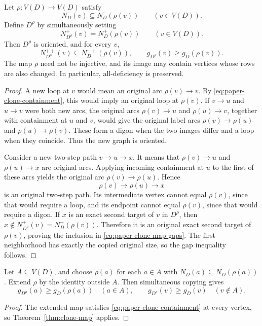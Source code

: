 \begin{theorem}
\label{thm:clone-map}
Let $\rho:V(D)\to V(D)$ satisfy
\begin{equation}
 N_D^-(v)\subseteq N_D^-(\rho(v))\qquad(v\in V(D)).
 \label{eq:paper-clone-containment}
\end{equation}
Define $D^\rho$ by simultaneously setting
\[
 N_{D^\rho}^+(v)=N_D^+(\rho(v))\qquad(v\in V(D)).
\]
Then $D^\rho$ is oriented, and for every $v$,
\begin{equation}
 N_{D^\rho}^{++}(v)\subseteq N_D^{++}(\rho(v)),
 \qquad g_{D^\rho}(v)\geq g_D(\rho(v)).
 \label{eq:paper-clone-map-gaps}
\end{equation}
The map $\rho$ need not be injective, and its image may contain vertices
whose rows are also changed. In particular, all-deficiency is preserved.
\end{theorem}
\begin{proof}
A new loop at $v$ would mean an original arc $\rho(v)\to v$.
By \eqref{eq:paper-clone-containment}, this would imply an original
loop at $\rho(v)$. If $v\to u$ and $u\to v$ were both new arcs,
the original arcs $\rho(v)\to u$ and $\rho(u)\to v$, together with
containment at $u$ and $v$, would give the original label arcs
$\rho(v)\to\rho(u)$ and $\rho(u)\to\rho(v)$. These form a digon
when the two images differ and a loop when they coincide. Thus the
new graph is oriented.

Consider a new two-step path $v\to u\to x$. It means that
$\rho(v)\to u$ and $\rho(u)\to x$ are original arcs. Applying
incoming containment at $u$ to the first of these arcs yields the
original arc $\rho(v)\to\rho(u)$. Hence
\[
 \rho(v)\to\rho(u)\to x
\]
is an original two-step path. Its intermediate vertex cannot equal
$\rho(v)$, since that would require a loop, and its endpoint cannot
equal $\rho(v)$, since that would require a digon. If $x$ is an exact
second target of $v$ in $D^\rho$, then
$x\notin N_{D^\rho}^+(v)=N_D^+(\rho(v))$. Therefore it is an
original exact second target of $\rho(v)$, proving the inclusion in
\eqref{eq:paper-clone-map-gaps}. The first neighborhood has exactly
the copied original size, so the gap inequality follows.
\end{proof}

\begin{corollary}
\label{cor:paper-subset-copy}
Let $A\subseteq V(D)$, and choose $\rho(a)$ for each $a\in A$ with
$N_D^-(a)\subseteq N_D^-(\rho(a))$. Extend $\rho$ by the identity
outside $A$. Then simultaneous copying gives
\[
 g_{D^\rho}(a)\geq g_D(\rho(a))\quad(a\in A),\qquad
 g_{D^\rho}(v)\geq g_D(v)\quad(v\notin A).
\]
\end{corollary}
\begin{proof}
The extended map satisfies \eqref{eq:paper-clone-containment} at every
vertex, so Theorem~\ref{thm:clone-map} applies.
\end{proof}

